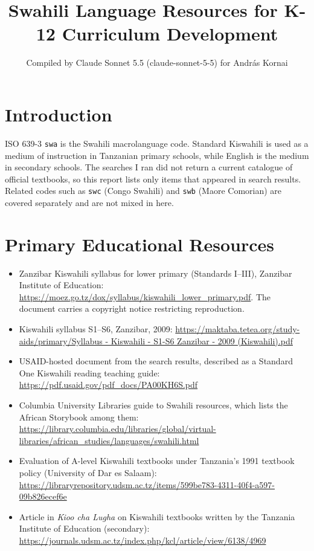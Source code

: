 \documentclass[12pt]{article}
\title{Swahili Language Resources for K-12 Curriculum Development}
\author{Compiled by Claude Sonnet 5.5 (claude-sonnet-5-5) for Andr\'as Kornai}
\date{}
\begin{document}
\maketitle

\section{Introduction}
ISO 639-3 \texttt{swa} is the Swahili macrolanguage code. Standard Kiswahili is used as a medium of instruction in Tanzanian primary schools, while English is the medium in secondary schools. The searches I ran did not return a current catalogue of official textbooks, so this report lists only items that appeared in search results. Related codes such as \texttt{swc} (Congo Swahili) and \texttt{swb} (Maore Comorian) are covered separately and are not mixed in here.

\section{Primary Educational Resources}
\begin{itemize}
\item Zanzibar Kiswahili syllabus for lower primary (Standards I--III), Zanzibar Institute of Education: \url{https://moez.go.tz/dox/syllabus/kiswahili_lower_primary.pdf}. The document carries a copyright notice restricting reproduction.
\item Kiswahili syllabus S1--S6, Zanzibar, 2009: \url{https://maktaba.tetea.org/study-aids/primary/Syllabus - Kiswahili - S1-S6 Zanzibar - 2009 (Kiswahili).pdf}
\item USAID-hosted document from the search results, described as a Standard One Kiswahili reading teaching guide: \url{https://pdf.usaid.gov/pdf_docs/PA00KH6S.pdf}
\item Columbia University Libraries guide to Swahili resources, which lists the African Storybook among them: \url{https://library.columbia.edu/libraries/global/virtual-libraries/african_studies/languages/swahili.html}
\item Evaluation of A-level Kiswahili textbooks under Tanzania's 1991 textbook policy (University of Dar es Salaam): \url{https://libraryrepository.udsm.ac.tz/items/599be783-4311-40f4-a597-09b826ecef6e}
\item Article in \textit{Kioo cha Lugha} on Kiswahili textbooks written by the Tanzania Institute of Education (secondary): \url{https://journals.udsm.ac.tz/index.php/kcl/article/view/6138/4969}
\end{itemize}
\end{document}
